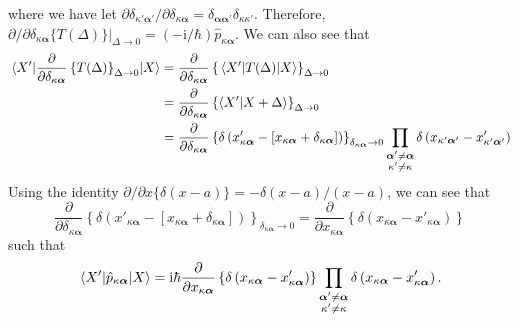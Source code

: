 \documentclass{article}
\numberwithin{equation}{section}
\begin{document}
where we have let $\partial\delta_{\kappa'\bm{\alpha}'}/\partial\delta_{\kappa\bm{\alpha}} = \delta_{\bm{\alpha}\bm{\alpha}'}\delta_{\kappa\kappa'}$. Therefore, $\partial/\partial\delta_{\kappa\bm{\alpha}}\{T(\Delta)\}|_{\Delta\to0} = (-\mathrm{i}/\hbar)\hat{p}_{\kappa\bm{\alpha}}$. We can also see that
\begin{equation}
\begin{split}
\mel{X'}{\frac{\partial}{\partial\delta_{\kappa\bm{\alpha}}}\left\{T(\Delta)\right\}_{\Delta\to0}}{X} &= \frac{\partial}{\partial\delta_{\kappa\bm{\alpha}}}\left\{\mel{X'}{T(\Delta)}{X}\right\}_{\Delta\to0}\\
&= \frac{\partial}{\partial\delta_{\kappa\bm{\alpha}}}\left\{\braket{X'}{X + \Delta}\right\}_{\Delta\to0}\\
&= \frac{\partial}{\partial\delta_{\kappa\bm{\alpha}}}\left\{\delta\left(x'_{\kappa\bm{\alpha}} - [x_{\kappa\bm{\alpha}} + \delta_{\kappa\bm{\alpha}}]\right)\right\}_{\delta_{\kappa\bm{\alpha}}\to0}\prod_{\substack{\bm{\alpha}'\neq\bm{\alpha}\\\kappa'\neq\kappa}}\delta\left(x_{\kappa'\bm{\alpha}'} - x'_{\kappa'\bm{\alpha}'}\right)
\end{split}
\end{equation}
Using the identity $\partial/\partial x\{\delta(x - a)\} = -\delta(x - a)/(x - a)$, we can see that
\begin{equation}
\frac{\partial}{\partial\delta_{\kappa\bm{\alpha}}}\left\{\delta\left(x'_{\kappa\bm{\alpha}} - [x_{\kappa\bm{\alpha}} + \delta_{\kappa\bm{\alpha}}]\right)\right\}_{\delta_{\kappa\bm{\alpha}}\to0} = \frac{\partial}{\partial x_{\kappa\bm{\alpha}}}\left\{\delta\left(x_{\kappa\bm{\alpha}} - x'_{\kappa\bm{\alpha}}\right)\right\}
\end{equation}
such that
\begin{equation}
\mel{X'}{\hat{p}_{\kappa\bm{\alpha}}}{X} = \mathrm{i}\hbar\frac{\partial}{\partial x_{\kappa\bm{\alpha}}}\left\{\delta\left(x_{\kappa\bm{\alpha}} - x'_{\kappa\bm{\alpha}}\right)\right\}\prod_{\substack{\bm{\alpha}'\neq\bm{\alpha}\\\kappa'\neq\kappa}}\delta\left(x_{\kappa\bm{\alpha}} - x'_{\kappa\bm{\alpha}}\right).
\end{equation}
\end{document}
